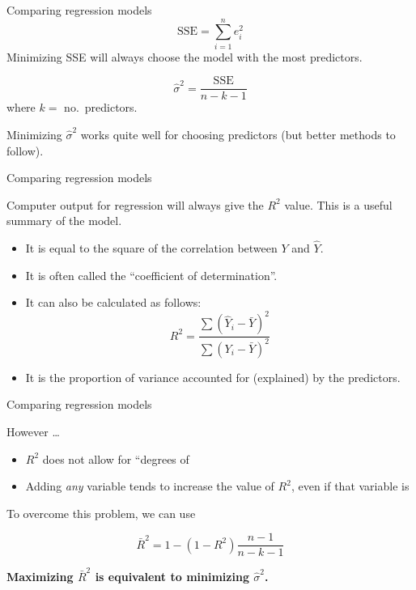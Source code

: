 \documentclass[14pt]{beamer}
\makeatletter
\def\biz{\begin{itemize}[<+-| alert@+>]}
\def\eiz{\end{itemize}}
\makeatother
\begin{document}
\begin{frame}{Comparing regression models}
\[\text{SSE} = \sum_{i=1}^n e_i^2 \]
Minimizing SSE will always choose the model with the most predictors.

\pause
{}
\[
\hat{\sigma}^2 = \frac{\text{SSE}}{n-k-1}
\]
where $k=$ no.\ predictors.\pause

Minimizing $\hat{\sigma}^2$ works quite well for choosing predictors (but better methods to follow).

\end{frame}
\begin{frame}{Comparing regression models}

Computer output for regression will always give the $R^2$ value. This is a
useful summary of the model.
\biz%
\item It is equal to the square of the correlation between $Y$ and $\hat Y$.

\item It is often called the ``coefficient of determination''.

\item It can also be calculated as follows:
$$R^2 = \frac{\sum(\hat{Y}_i - \bar{Y})^2}{\sum(Y_i-\bar{Y})^2}
$$

\item It is
the proportion of variance accounted for (explained) by the predictors.
\eiz
\end{frame}

\begin{frame}{Comparing regression models}

However \dots
\biz
\item $R^2$  does not allow for ``degrees of 

\item Adding \textit{any} variable tends to increase the value of $R^2$, even if that variable is
\eiz\pause

To overcome   this problem, we can use 
\begin{block}{}
\[
\bar{R}^2 = 1-(1-R^2)\frac{n-1}{n-k-1}
\]
\end{block}
\pause

\centerline{\textcolor[rgb]{0.8,0.00,0.00}{\textbf{Maximizing $\bar{R}^2$ is equivalent to minimizing $\hat\sigma^2$.}}}

\end{frame}
\end{document}
